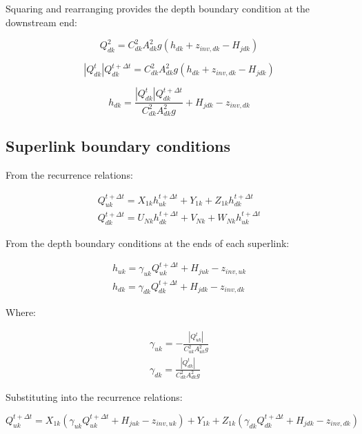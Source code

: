 \documentclass[11pt]{article}
\begin{document}
Squaring and rearranging provides the depth boundary condition at the downstream
end:

\begin{equation}
 Q_{dk}^2 = C_{dk}^2 A_{dk}^2 g (h_{dk} + z_{inv, dk} - H_{jdk})
\end{equation}

\begin{equation}
 |Q_{dk}^{t}| Q_{dk}^{t + \Delta t} = C_{dk}^2 A_{dk}^2 g (h_{dk} + z_{inv, dk} - H_{jdk})
\end{equation}

\begin{equation}
  h_{dk} = \frac{|Q_{dk}^{t}| Q_{dk}^{t + \Delta t}}{C_{dk}^2 A_{dk}^2 g} + H_{jdk} - z_{inv, dk}
\end{equation}

\subsection*{Superlink boundary conditions}

From the recurrence relations:

\begin{align}
  Q_{uk}^{t + \Delta t} = X_{1k} h_{uk}^{t + \Delta t} + Y_{1k} + Z_{1k} h_{dk}^{t + \Delta t} \\
  Q_{dk}^{t + \Delta t} = U_{Nk} h_{dk}^{t + \Delta t} + V_{Nk} + W_{Nk} h_{uk}^{t + \Delta t}
\end{align}

From the depth boundary conditions at the ends of each superlink:

\begin{align}
  h_{uk} = \gamma_{uk} Q_{uk}^{t + \Delta t} + H_{juk} - z_{inv, uk} \\
  h_{dk} = \gamma_{dk} Q_{dk}^{t + \Delta t} + H_{jdk} - z_{inv, dk}
\end{align}

Where:

\begin{align}
  \gamma_{uk} = -\frac{|Q_{uk}^{t}|}{C_{uk}^2 A_{uk}^2 g} \\
  \gamma_{dk} = \frac{|Q_{dk}^{t}|}{C_{dk}^2 A_{dk}^2 g}
\end{align}

Substituting into the recurrence relations:

\begin{equation}
  Q_{uk}^{t + \Delta t} = X_{1k} (\gamma_{uk} Q_{uk}^{t + \Delta t} + H_{juk} - z_{inv, uk})
  + Y_{1k} + Z_{1k} (\gamma_{dk} Q_{dk}^{t + \Delta t} + H_{jdk} - z_{inv, dk})
\end{equation}
\end{document}
